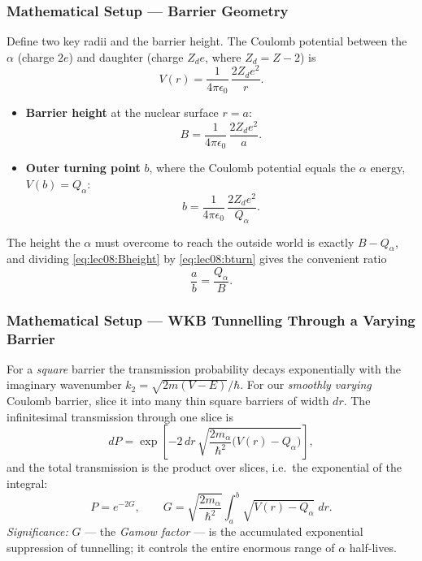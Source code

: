\subsubsection*{Mathematical Setup --- Barrier Geometry}
Define two key radii and the barrier height.  The Coulomb potential between the
$\alpha$ (charge $2e$) and daughter (charge $Z_d e$, where $Z_d = Z-2$) is
\begin{equation}
  \label{eq:lec08:coulomb}
  V(r) = \frac{1}{4\pi\epsilon_0}\,\frac{2 Z_d e^2}{r}.
\end{equation}
\begin{itemize}
  \item \textbf{Barrier height} at the nuclear surface $r=a$:
  \begin{equation}
    \label{eq:lec08:Bheight}
    B = \frac{1}{4\pi\epsilon_0}\,\frac{2 Z_d e^2}{a}.
  \end{equation}
  \item \textbf{Outer turning point} $b$, where the Coulomb potential equals the
  $\alpha$ energy, $V(b) = Q_\alpha$:
  \begin{equation}
    \label{eq:lec08:bturn}
    b = \frac{1}{4\pi\epsilon_0}\,\frac{2 Z_d e^2}{Q_\alpha}.
  \end{equation}
\end{itemize}
The height the $\alpha$ must overcome to reach the outside world is exactly
$B - Q_\alpha$, and dividing \eqref{eq:lec08:Bheight} by \eqref{eq:lec08:bturn}
gives the convenient ratio
\begin{equation}
  \label{eq:lec08:ratio}
  \frac{a}{b} = \frac{Q_\alpha}{B}.
\end{equation}

\subsubsection*{Mathematical Setup --- WKB Tunnelling Through a Varying Barrier}
For a \emph{square} barrier the transmission probability decays exponentially with
the imaginary wavenumber $k_2 = \sqrt{2m(V-E)}/\hbar$.  For our \emph{smoothly
varying} Coulomb barrier, slice it into many thin square barriers of width $dr$.
The infinitesimal transmission through one slice is
\begin{equation}
  \label{eq:lec08:slice}
  dP = \exp\!\left[-2\,dr\,\sqrt{\frac{2m_\alpha}{\hbar^2}\bigl(V(r) - Q_\alpha\bigr)}\right],
\end{equation}
and the total transmission is the product over slices, i.e.\ the exponential of
the integral:
\begin{equation}
  \label{eq:lec08:tunnel}
  \boxed{P = e^{-2G},
   \qquad
   G = \sqrt{\frac{2m_\alpha}{\hbar^2}}
       \int_{a}^{b}\sqrt{V(r) - Q_\alpha}\;dr.}
\end{equation}
\textit{Significance:} $G$ --- the \emph{Gamow factor} --- is the accumulated
exponential suppression of tunnelling; it controls the entire enormous range of
$\alpha$ half-lives.


